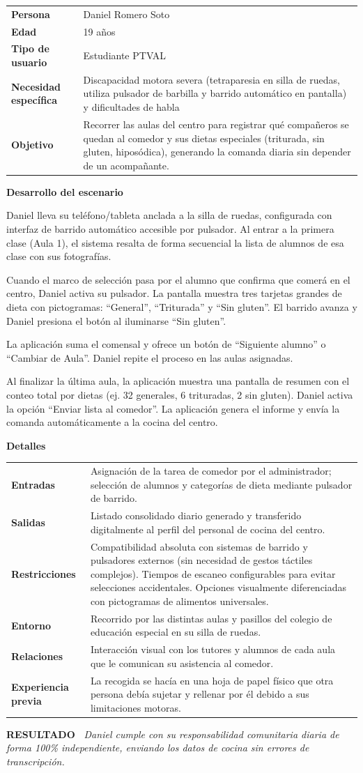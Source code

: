 \documentclass[11pt,a4paper]{article}
\makeatletter
\newcommand{\escenariocard}[6]{%
\needspace{10\baselineskip}
\begin{tcolorbox}[breakable,enhanced,colback=white,colframe=brandgreen,boxrule=0.8pt,arc=3pt,
 left=9pt,right=9pt,top=7pt,bottom=7pt,before skip=10pt,after skip=10pt,
 title={\textbf{\color{white}ESCENARIO #1} \\[1pt] {\small\color{tintgreen}#2}},
 colbacktitle=brandgreen,coltitle=white,fonttitle=\bfseries,boxed title style={colframe=brandgreen}]
{\setlength{\parskip}{0pt}\renewcommand{\arraystretch}{1.35}\rowcolors{1}{tintgreen}{white}\arrayrulecolor{white}
\begin{tabular}{@{\hspace{4pt}}>{\bfseries\color{brandgreen}}p{3.4cm}p{11.4cm}@{}}
#3 \\
\end{tabular}}
\vspace{6pt}
\textbf{\color{brandblue}Desarrollo del escenario}\par\vspace{2pt}
#4
\par\vspace{4pt}
\textbf{\color{brandblue}Detalles}\par\vspace{2pt}
{\setlength{\parskip}{0pt}\renewcommand{\arraystretch}{1.35}\rowcolors{1}{tintblue}{white}\arrayrulecolor{white}
\begin{tabular}{@{\hspace{4pt}}>{\bfseries\color{brandblue}}p{3.4cm}p{11.4cm}@{}}
#5 \\
\end{tabular}}
\vspace{6pt}
\begin{tcolorbox}[colback=tintblue,colframe=brandblue,boxrule=0pt,sharp corners,borderline west={3pt}{0pt}{brandblue},left=8pt,right=8pt,top=5pt,bottom=5pt]
\textbf{\small\color{brandblue}RESULTADO\ } {\small\itshape #6}
\end{tcolorbox}
\end{tcolorbox}
}
\makeatother
\begin{document}
\escenariocard{2}{Registro matutino del menú de comedor mediante pulsador adaptado}{%
Persona & Daniel Romero Soto \\
Edad & 19 años \\
Tipo de usuario & Estudiante PTVAL \\
Necesidad específica & Discapacidad motora severa (tetraparesia en silla de ruedas, utiliza pulsador de barbilla y barrido automático en pantalla) y dificultades de habla \\
Objetivo & Recorrer las aulas del centro para registrar qué compañeros se quedan al comedor y sus dietas especiales (triturada, sin gluten, hiposódica), generando la comanda diaria sin depender de un acompañante.
}{%
Daniel lleva su teléfono/tableta anclada a la silla de ruedas, configurada con interfaz de barrido automático accesible por pulsador. Al entrar a la primera clase (Aula 1), el sistema resalta de forma secuencial la lista de alumnos de esa clase con sus fotografías.

Cuando el marco de selección pasa por el alumno que confirma que comerá en el centro, Daniel activa su pulsador. La pantalla muestra tres tarjetas grandes de dieta con pictogramas: ``General'', ``Triturada'' y ``Sin gluten''. El barrido avanza y Daniel presiona el botón al iluminarse ``Sin gluten''.

La aplicación suma el comensal y ofrece un botón de ``Siguiente alumno'' o ``Cambiar de Aula''. Daniel repite el proceso en las aulas asignadas.

Al finalizar la última aula, la aplicación muestra una pantalla de resumen con el conteo total por dietas (ej. 32 generales, 6 trituradas, 2 sin gluten). Daniel activa la opción ``Enviar lista al comedor''. La aplicación genera el informe y envía la comanda automáticamente a la cocina del centro.
}{%
Entradas & Asignación de la tarea de comedor por el administrador; selección de alumnos y categorías de dieta mediante pulsador de barrido. \\
Salidas & Listado consolidado diario generado y transferido digitalmente al perfil del personal de cocina del centro. \\
Restricciones & Compatibilidad absoluta con sistemas de barrido y pulsadores externos (sin necesidad de gestos táctiles complejos). Tiempos de escaneo configurables para evitar selecciones accidentales. Opciones visualmente diferenciadas con pictogramas de alimentos universales. \\
Entorno & Recorrido por las distintas aulas y pasillos del colegio de educación especial en su silla de ruedas. \\
Relaciones & Interacción visual con los tutores y alumnos de cada aula que le comunican su asistencia al comedor. \\
Experiencia previa & La recogida se hacía en una hoja de papel físico que otra persona debía sujetar y rellenar por él debido a sus limitaciones motoras.
}{Daniel cumple con su responsabilidad comunitaria diaria de forma 100\% independiente, enviando los datos de cocina sin errores de transcripción.}
\end{document}
